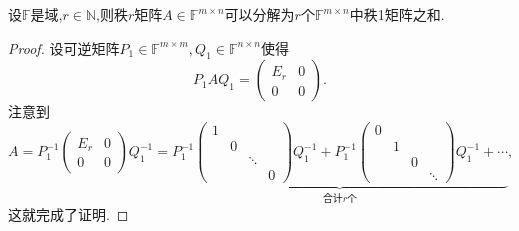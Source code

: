 \documentclass[../../main.tex]{subfiles}
\begin{document}
\begin{theorem}[秩一分解]\label{theorem:秩一分解}
设\( \mathbb{F} \)是域,\( r \in \mathbb{N} \),则秩\( r \)矩阵\( A \in \mathbb{F}^{m \times n} \)可以分解为\( r \)个\( \mathbb{F}^{m \times n} \)中秩1矩阵之和.
\end{theorem}
\begin{proof}
设可逆矩阵\( P_1 \in \mathbb{F}^{m \times m}, Q_1 \in \mathbb{F}^{n \times n} \)使得
\[
P_1 A Q_1 = \begin{pmatrix} E_r & 0 \\ 0 & 0 \end{pmatrix}.
\]
注意到
\[
A = P_1^{-1} \begin{pmatrix} E_r & 0 \\ 0 & 0 \end{pmatrix} Q_1^{-1} = \underbrace{P_1^{-1} \begin{pmatrix} 1 & & \\ & 0 & \\ & & \ddots \\ & & & 0 \end{pmatrix} Q_1^{-1} + P_1^{-1} \begin{pmatrix} 0 & & \\ & 1 & \\ & & 0 \\ & & & \ddots \end{pmatrix} Q_1^{-1} + \cdots}_{\text{合计} r \text{个}},
\]
这就完成了证明.
\end{proof}
\end{document}
